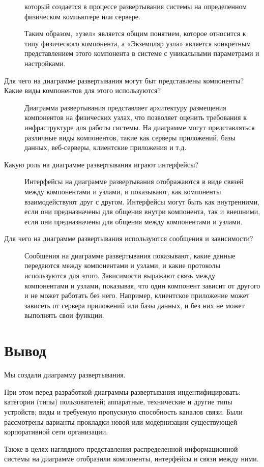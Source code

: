 \begin{description}
		который создается в процессе развертывания системы на определенном
		физическом компьютере или сервере. \par
		Таким образом, «узел» является общим понятием, которое относится
		к типу физического компонента, а «Экземпляр узла» является конкретным
		представлением этого компонента в системе с уникальными параметрами
		и настройками.
	\item [Для чего на диаграмме развертывания могут быт представлены
		компоненты? Какие виды компонентов для этого используются?]
		Диаграмма развертывания представляет архитектуру размещения
		компонентов на физических узлах, что позволяет оценить требования к
		инфраструктуре для работы системы. На диаграмме могут представляться
		различные виды компонентов, такие как серверы приложений, базы данных,
		веб-серверы, клиентские приложения и т.д.
	\item [Какую роль на диаграмме развертывания играют интерфейсы?]
		Интерфейсы на диаграмме развертывания отображаются в виде связей
		между компонентами и узлами, и показывают, как компоненты
		взаимодействуют друг с другом.
		Интерфейсы могут быть как внутренними, если они
		предназначены для общения внутри компонента, так и внешними, если они
		предназначены для общения между компонентами и узлами.
	\item [Для чего на диаграмме развертывания используются сообщения и
		зависимости?]
		Сообщения на диаграмме развертывания показывают,
		какие данные передаются между компонентами и узлами,
		и какие протоколы используются для этого.
		Зависимости выражают связь между компонентами и узлами, показывая,
		что один компонент зависит от другого и не может работать без него.
		Например, клиентское приложение может зависеть от сервера приложений
		или базы данных, и без них не может выполнять свои функции.
\end{description}

\clearpage

\section*{\LARGE Вывод}
Мы создали диаграмму развертывания.\par
При этом перед разработкой диаграммы развертывания индентифицировать:
категории (типы) пользователей; аппаратные, технические и другие типы
устройств; виды и требуемую пропускную способность каналов связи.
Были рассмотрены варианты прокладки новой или модернизации
существующей корпоративной сети организации.\par
Также в целях наглядного представления распределенной информационной
системы на диаграмме отобразили компоненты, интерфейсы и
связи между ними.

